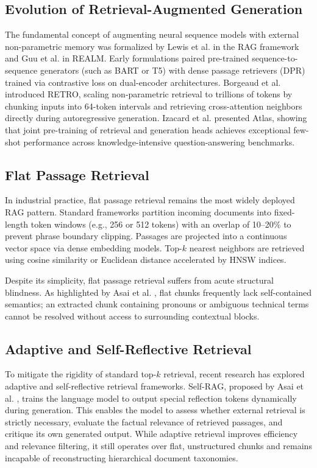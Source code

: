 \documentclass[12pt,a4paper]{report}
\begin{document}
\subsection{Evolution of Retrieval-Augmented Generation}
The fundamental concept of augmenting neural sequence models with external non-parametric memory was formalized by Lewis et al. \cite{lewis2020rag} in the RAG framework and Guu et al. \cite{guu2020realm} in REALM. Early formulations paired pre-trained sequence-to-sequence generators (such as BART or T5) with dense passage retrievers (DPR) trained via contrastive loss on dual-encoder architectures. Borgeaud et al. \cite{borgeaud2022retro} introduced RETRO, scaling non-parametric retrieval to trillions of tokens by chunking inputs into 64-token intervals and retrieving cross-attention neighbors directly during autoregressive generation. Izacard et al. \cite{izacard2023atlas} presented Atlas, showing that joint pre-training of retrieval and generation heads achieves exceptional few-shot performance across knowledge-intensive question-answering benchmarks.

\subsection{Flat Passage Retrieval}
In industrial practice, flat passage retrieval remains the most widely deployed RAG pattern. Standard frameworks partition incoming documents into fixed-length token windows (e.g., 256 or 512 tokens) with an overlap of 10--20\% to prevent phrase boundary clipping. Passages are projected into a continuous vector space via dense embedding models. Top-$k$ nearest neighbors are retrieved using cosine similarity or Euclidean distance accelerated by HNSW indices. 

Despite its simplicity, flat passage retrieval suffers from acute structural blindness. As highlighted by Asai et al. \cite{asai2024selfrag}, flat chunks frequently lack self-contained semantics; an extracted chunk containing pronouns or ambiguous technical terms cannot be resolved without access to surrounding contextual blocks.

\subsection{Adaptive and Self-Reflective Retrieval}
To mitigate the rigidity of standard top-$k$ retrieval, recent research has explored adaptive and self-reflective retrieval frameworks. Self-RAG, proposed by Asai et al. \cite{asai2024selfrag}, trains the language model to output special reflection tokens dynamically during generation. This enables the model to assess whether external retrieval is strictly necessary, evaluate the factual relevance of retrieved passages, and critique its own generated output. While adaptive retrieval improves efficiency and relevance filtering, it still operates over flat, unstructured chunks and remains incapable of reconstructing hierarchical document taxonomies.
\end{document}
